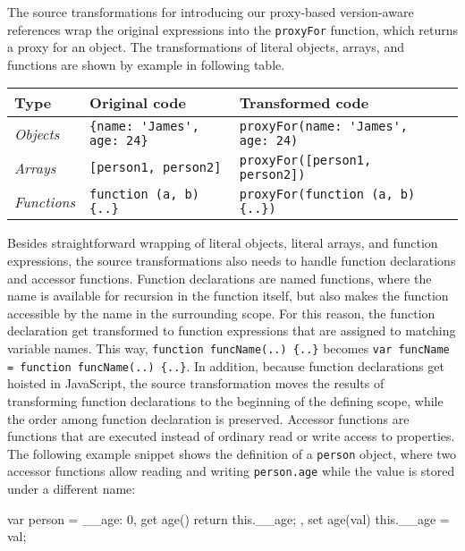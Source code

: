 The source transformations for introducing our proxy-based version-aware references wrap the original expressions into the \lstinline{proxyFor} function, which returns a proxy for an object.
The transformations of literal objects, arrays, and functions are shown by example in following table.

\begin{center}
    \begin{tabular}{| l | l | l | l |}
    \hline
    Type & Original code & Transformed code \\ \hline
    \emph{Objects} & \lstinline|{name: 'James', age: 24}| & \lstinline|proxyFor(name: 'James', age: 24)| \\ \hline
    \emph{Arrays} & \lstinline|[person1, person2]| & \lstinline|proxyFor([person1, person2])| \\ \hline
    \emph{Functions} & \lstinline|function (a, b) {..}| & \lstinline|proxyFor(function (a, b) {..})| \\ \hline
    \end{tabular}
\end{center}

Besides straightforward wrapping of literal objects, literal arrays, and function expressions, the source transformations also needs to handle function declarations and accessor functions.
Function declarations are named functions, where the name is available for recursion in the function itself, but also makes the function accessible by the name in the surrounding scope.
For this reason, the function declaration get transformed to function expressions that are assigned to matching variable names.
This way, \lstinline|function funcName(..) {..}| becomes \lstinline|var funcName = function funcName(..) {..}|.
In addition, because function declarations get hoisted in JavaScript, the source transformation moves the results of transforming function declarations to the beginning of the defining scope, while the order among function declaration is preserved.
Accessor functions are functions that are executed instead of ordinary read or write access to properties.
The following example snippet shows the definition of a \lstinline{person} object, where two accessor functions allow reading and writing \lstinline{person.age} while the value is stored under a different name: \\
\iffalse
\begin{verbatim}\fi
\begin{code}{}{}
var person = {
    __age: 0,
    get age() {
        return this.__age;
    },
    set age(val) {
        this.__age = val;
    }
}
\end{code}
\iffalse
\end{verbatim}\fi

